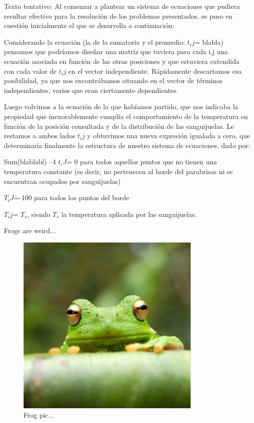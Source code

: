 \documentclass[double,12pt]{beavtex}
\begin{document}
{\color{red}Texto tentativo:
Al  comenzar a plantear un sistema de ecuaciones que pudiera resultar efectivo para la resoluci\'on de los problemas presentados, se puso en cuesti\'on inicialmente el que se desarrolla a continuaci\'on:

Considerando la ecuaci\'on (la de la sumatoria y el promedio: $ t_ij$= blabla) pensamos que podr\'iamos diseñar una matriz que tuviera para cada i,j una ecuaci\'on asociada en funci\'on de las otras posiciones y que estuviera extendida con cada valor de $t_ij$ en el vector independiente. R\'apidamente descartamos esa posibilidad, ya que nos encontr\'abamos situando en el vector de t\'erminos independientes, varios que eran ciertamente dependientes.

Luego volvimos a la ecuaci\'on de la que hab\'iamos partido, que nos indicaba la propiedad que inexorablemente cumpl\'ia el comportamiento de la temperatura en funci\'on de la posici\'on consultada  y de la distribuci\'on de las sanguijuelas.  Le restamos a ambos lados $t_ij$ y obtuvimos una nueva expresi\'on igualada a cero, que determinar\'ia finalmente la estructura de nuestro sistema de ecuaciones, dado por:

	Sum(blablabl) –4 $t_iJ$= 0 para todos aquellos puntos que no tienen una temperatura constante (es decir, no pertenecen al borde del parabrisas ni se encuentran ocupados por sanguijuelas)



	$T_iJ$=-100 para todos los puntos del borde

	$T_ij$= $T_s$, siendo $T_s$ la temperatura aplicada por las sanguijuelas.
}




Frogs are weird...

\begin{figure}[ht!]
\begin{center}
	\includegraphics[width=9cm]{frog.jpg}
	\caption{Frog pic...}
	\label{fig:frog}
	\end{center}
\end{figure}
\end{document}
